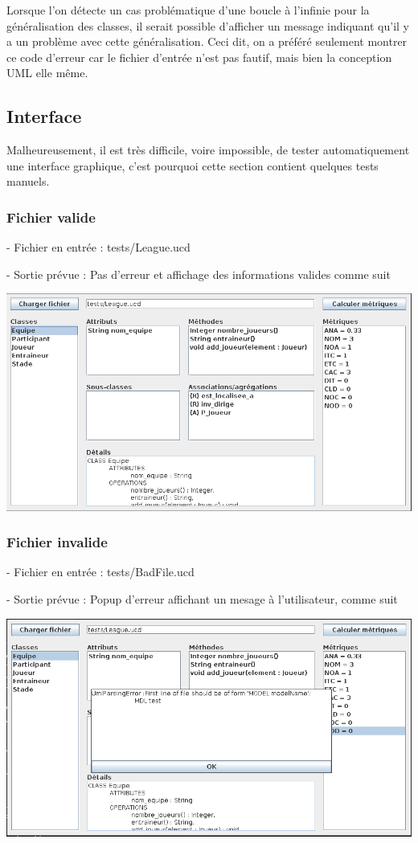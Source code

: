 \documentclass[letter,french]{report}
\begin{document}
  Lorsque l'on détecte un cas problématique d'une boucle à l'infinie pour
  la généralisation des classes, il serait possible d'afficher un message
  indiquant qu'il y a un problème avec cette généralisation. Ceci dit, on a
  préféré seulement montrer ce code d'erreur car le fichier d'entrée n'est pas
  fautif, mais bien la conception UML elle même.
  
  \subsection*{Interface}
  Malheureusement, il est très difficile, voire impossible, de tester
  automatiquement une interface graphique, c'est pourquoi cette section
  contient quelques tests manuels.

  \subsubsection*{Fichier valide}
  - Fichier en entrée : tests/League.ucd

  - Sortie prévue : Pas d'erreur et affichage des informations valides comme suit

	\includegraphics[scale=.4]{images/ExecutionNormale.png}

  \subsubsection*{Fichier invalide}
  - Fichier en entrée : tests/BadFile.ucd

  - Sortie prévue : Popup d'erreur affichant un mesage à l'utilisateur, comme suit

	\includegraphics[scale=.4]{images/ErrorPopup.png}
\end{document}
